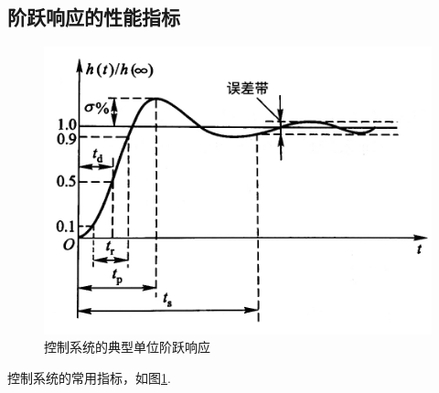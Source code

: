\subsection{阶跃响应的性能指标}
\begin{figure}[!htp]
	\centering
	\includegraphics[width=0.5\linewidth]{pic/性能指标.jpg}
	\caption{控制系统的典型单位阶跃响应}
	\label{控制系统的典型单位阶跃响应}
\end{figure}
\noindent 控制系统的常用指标，如图\ref{控制系统的典型单位阶跃响应}.
